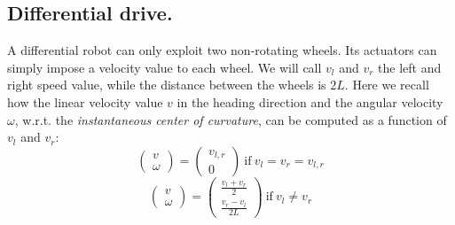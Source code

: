	\subsection{Differential drive.}
		\label{app.differential_drive}
	
		A differential robot can only exploit two non-rotating wheels. 
		Its actuators can simply impose a velocity value to each wheel. 
		We will call $v_l$ and $v_r$ the left and right speed value, while the distance between the wheels is $2L$.
		Here we recall how the linear velocity value $v$ in the heading direction and the angular velocity $\omega$, w.r.t. the \emph{instantaneous center of curvature}, can be computed as a function of $v_l$ and $v_r$:
		\begin{equation}
			\left(\begin{array}{c}
				v \\ \omega
			\end{array}\right)
			=
			\left(\begin{array}{c}
				v_{l,r} \\ 0
			\end{array}\right)
			\ \mathrm{if} \ v_l = v_r = v_{l,r}
		\end{equation}
		\begin{equation}
			\left(\begin{array}{c}
				v \\ 
				\omega
			\end{array}\right)
			=
			\left(\begin{array}{c}
				\frac{v_l + v_r}{2} \\ 
				\frac{v_r - v_l}{2L}
			\end{array}\right)
			\ \mathrm{if} \ v_l \neq v_r
		\end{equation}